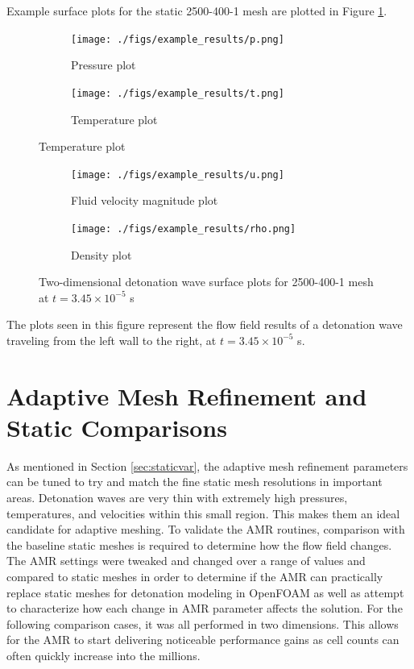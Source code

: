 Example surface plots for the static 2500-400-1 mesh are plotted in Figure \ref{fig:2dsurface}. 
\begin{figure}[]
    \centering
    \begin{subfigure}[]{\textwidth}
        \centering
        \texttt{[image: ./figs/example\_results/p.png]}
        \caption{Pressure plot}
    \end{subfigure}

    \begin{subfigure}[]{\textwidth}
        \centering
        \texttt{[image: ./figs/example\_results/t.png]}
        \caption{Temperature plot}
    \end{subfigure}

\end{figure}
\begin{figure} \ContinuedFloat
    
    \begin{subfigure}[]{\textwidth}
        \centering
        \texttt{[image: ./figs/example\_results/u.png]}
        \caption{Fluid velocity magnitude plot}
    \end{subfigure}

    \begin{subfigure}[]{\textwidth}
        \centering
        \texttt{[image: ./figs/example\_results/rho.png]}
        \caption{Density plot}
    \end{subfigure}

    \caption{Two-dimensional detonation wave surface plots for 2500-400-1 mesh at \(t = 3.45 \times 10^{ - 5} \) s}
    \label{fig:2dsurface}
\end{figure}%
\noindent The plots seen in this figure represent the flow field results of a detonation wave traveling from the left wall to the right, at \(t = 3.45 \times 10^{ - 5} \) s. 





\section{Adaptive Mesh Refinement and Static Comparisons}
As mentioned in Section \ref{sec:staticvar}, the adaptive mesh refinement parameters can be tuned to try and match the fine static mesh resolutions in important areas. Detonation waves are very thin with extremely high pressures, temperatures, and velocities within this small region. This makes them an ideal candidate for adaptive meshing. To validate the AMR routines, comparison with the baseline static meshes is required to determine how the flow field changes. The AMR settings were tweaked and changed over a range of values and compared to static meshes in order to determine if the AMR can practically replace static meshes for detonation modeling in OpenFOAM as well as attempt to characterize how each change in AMR parameter affects the solution. For the following comparison cases, it was all performed in two dimensions. This allows for the AMR to start delivering noticeable performance gains as cell counts can often quickly increase into the millions. 



